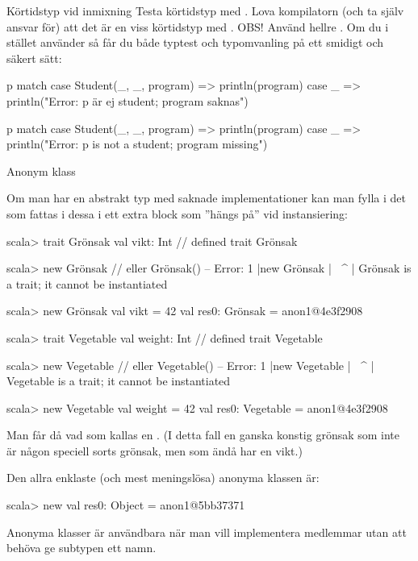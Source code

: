 \begin{Slide}{Körtidstyp vid inmixning}\SlideFontTiny
Testa körtidstyp med . Lova kompilatorn (och ta själv ansvar för) att det är en viss körtidstyp med . OBS! Använd hellre .
\ifkompendium
\noindent Om du i stället använder  så får du både typtest och typomvanling på ett smidigt och säkert sätt:
\ifswedish
\begin{Code}
  p match 
    case Student(_, _, program) => println(program)
    case _ => println("Error: p är ej student; program saknas")
\end{Code}
\else
\begin{Code}
  p match 
    case Student(_, _, program) => println(program)
    case _ => println("Error: p is not a student; program missing")
\end{Code}
\fi{}
\fi
\end{Slide}



  


\begin{Slide}{Anonym klass}\SlideFontSmall
\ifkompendium \ExplainAnonymousClass \fi

Om man har en abstrakt typ med saknade implementationer kan man fylla i det som fattas i dessa i ett extra block som ''hängs på'' vid instansiering:
\ifswedish
\begin{REPL}
scala> trait Grönsak { val vikt: Int }
// defined trait Grönsak

scala> new Grönsak    // eller Grönsak()
-- Error:
1 |new Grönsak
  |    ^^^^^^^
  |    Grönsak is a trait; it cannot be instantiated

scala> new Grönsak { val vikt = 42 }
val res0: Grönsak = anon1@4e3f2908
\end{REPL}
\else
\begin{REPL}
scala> trait Vegetable { val weight: Int }
// defined trait Vegetable

scala> new Vegetable    // eller Vegetable()
-- Error:
1 |new Vegetable
  |    ^^^^^^^
  |    Vegetable is a trait; it cannot be instantiated

scala> new Vegetable { val weight = 42 }
val res0: Vegetable = anon1@4e3f2908
\end{REPL}
\fi{}
Man får då vad som kallas en . (I detta fall en ganska konstig grönsak som inte är någon speciell sorts grönsak, men som ändå har en vikt.)

\vspace{0.5em}

\noindent Den allra enklaste (och mest meningslösa) anonyma klassen är:
\begin{REPLsmall}
scala> new {}
val res0: Object = anon1@5bb37371
\end{REPLsmall}
Anonyma klasser är användbara när man vill implementera medlemmar utan att behöva ge subtypen ett namn.
\end{Slide}


